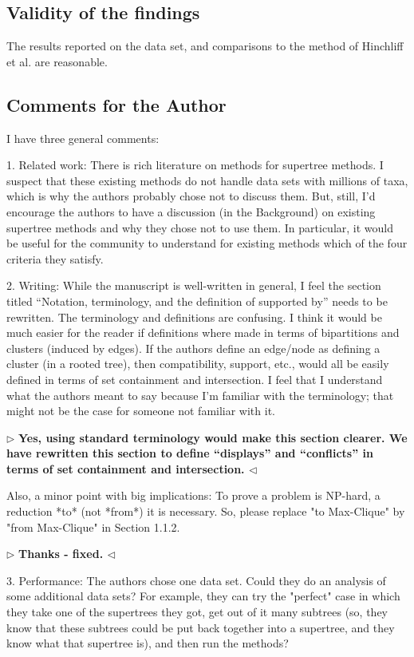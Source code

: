 \documentclass{article}
\newenvironment{reply}{$\triangleright$\bf}{$\triangleleft$}
\begin{document}
\subsection*{Validity of the findings}
The results reported on the data set, and comparisons to the method of Hinchliff et al. are reasonable.
\subsection*{Comments for the Author}
I have three general comments:

1. Related work: There is rich literature on methods for supertree methods. I suspect that these existing methods do not handle data sets with millions of taxa, which is why the authors probably chose not to discuss them. But, still, I'd encourage the authors to have a discussion (in the Background) on existing supertree methods and why they chose not to use them. In particular, it would be useful for the community to understand for existing methods which of the four criteria they satisfy.

2. Writing: While the manuscript is well-written in general, I feel the section titled ``Notation, terminology, and the definition of supported by'' needs to be rewritten. The terminology and definitions are confusing. I think it would be much easier for the reader if definitions where made in terms of bipartitions and clusters (induced by edges). If the authors define an edge/node as defining a cluster (in a rooted tree), then compatibility, support, etc., would all be easily defined in terms of set containment and intersection. I feel that I understand what the authors meant to say because I'm familiar with the terminology; that might not be the case for someone not familiar with it.

\begin{reply}
Yes, using standard terminology would make this section clearer.  We have rewritten this section to define ``displays'' and ``conflicts'' in terms of set containment and intersection.
\end{reply}

Also, a minor point with big implications: To prove a problem is NP-hard, a reduction *to* (not *from*) it is necessary. So, please replace "to Max-Clique" by "from Max-Clique" in Section 1.1.2.

\begin{reply}
Thanks - fixed.
\end{reply} 

3. Performance: The authors chose one data set. Could they do an analysis of some additional data sets? For example, they can try the "perfect" case in which they take one of the supertrees they got, get out of it many subtrees (so, they know that these subtrees could be put back together into a supertree, and they know what that supertree is), and then run the methods?
\end{document}
